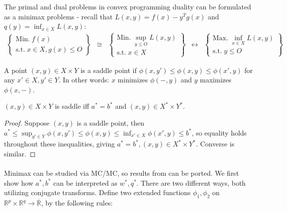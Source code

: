 \begin{exmp}
	The primal and dual problems in convex programming duality can be formulated as a minimax problems - recall that $L(x,y)=f(x)-y^Tg(x)$ and $q(y)=\inf_{x\in X}L(x,y)$:
	\[
		\begin{matrix}
			\begin{Bmatrix}
				\text{Min.}\; f(x) \\
				\text{s.t.}\;  x\in X,g(x)\leq O
			\end{Bmatrix}      & \cong           &
			\begin{Bmatrix}
				\text{Min.}\; \sup_{y\leq O}L(x,y) \\
				\text{s.t.}\;  x\in X
			\end{Bmatrix} & \leftrightarrow &
			\begin{Bmatrix}
				\text{Max.}\;    \inf_{x\in X }L(x, y) \\
				\text{s.t.}\;    y\leq O
			\end{Bmatrix}
		\end{matrix}
	\]
\end{exmp}

\begin{defn}\label{defn:047-saddle}
	A point $(x,y)\in X\times Y$ is a saddle point if $\phi(x,y')\leq \phi(x,y)\leq \phi(x',y)$ for any $x'\in X,y'\in Y$. In other words: $x$ minimizes $\phi(-,y)$ and $y$ maximizes $\phi(x,-)$.
\end{defn}

\begin{lemm}\label{lemm:047-classify-saddle}
	$(x,y)\in X\times Y$ is saddle iff $a^\ast=b^\ast$ and $(x,y)\in X^\ast\times Y^\ast$.
\end{lemm}
\begin{proof}
	Suppose $(x,y)$ is a saddle point, then $a^\ast\leq \sup_{y'\in Y}\phi(x,y')\leq \phi(x,y)\leq \inf_{x'\in X}\phi(x',y)\leq b^\ast$, so equality holds throughout these inequalities, giving $a^\ast=b^\ast,(x,y)\in X^\ast\times Y^\ast$. Converse is similar.
\end{proof}

\paragraph{}Minimax can be studied via MC/MC, so results from  can be ported. We first show how $a^\ast,b^\ast$ can be interpreted as $w^\ast,q^\ast$. There are two different ways, both utilizing conjugate transforms. Define two extended functions $\phi_1,\phi_2$ on $\mathbb{R}^p\times \mathbb{R}^q\to \overline{\mathbb{R}}$, by the following rules:

